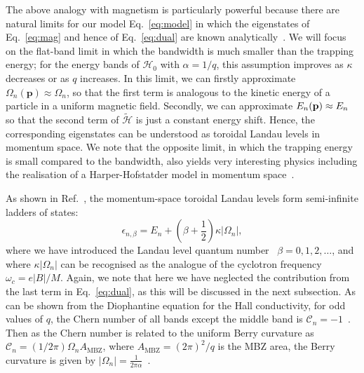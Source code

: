 The above analogy with magnetism is particularly powerful because
there are natural limits for our model Eq.~\eqref{eq:model} in which the
eigenstates of Eq.~\eqref{eq:mag} and hence of Eq.~\eqref{eq:dual} are
known analytically~\cite{price2014magnetic, ozawa2014momhh,
Claassen_prl_2015}. We will focus on the flat-band limit in which the
bandwidth is much smaller than the trapping energy; for the energy
bands of $\mathcal{H}_0$ with $\alpha = 1/q$, this assumption improves
as $\kappa$ decreases or as $q$ increases. In this limit, we can
firstly approximate $\Omega_{n}(\mathbf{p}) \approx \Omega_n$, so that
the first term is analogous to the kinetic energy of a particle in a
uniform magnetic field. Secondly, we can approximate $E_n(\mathbf{p})
\approx E_n$ so that the second term of $\widetilde{\mathcal{H}}$ is
just a constant energy shift. Hence, the corresponding eigenstates can
be understood as toroidal Landau levels in momentum space. We note
that the opposite limit, in which the trapping energy is small
compared to the bandwidth, also yields very interesting physics
including the realisation of a Harper-Hofstatder model in momentum
space~\cite{ozawa2014momhh, scaffidi2014exact}.

As shown in Ref.~\cite{price2014magnetic}, the momentum-space toroidal
Landau levels form semi-infinite ladders of states:
%
\begin{equation}\label{eq:ladders} \epsilon_{n,\beta} = E_n +
\left(\beta + \frac{1}{2}\right) \kappa |\Omega_n| ,
\end{equation} where we have introduced the Landau level quantum
number~\cite{Landau:101810} $\beta = 0,1,2,\dots$, and where $\kappa
|\Omega_n|$ can be
recognised as the analogue of the cyclotron frequency $\omega_c = e
|B| /M $. Again, we note that here we have neglected the contribution
from the last term in Eq.~\eqref{eq:dual}, as this will be discussed in
the next subsection. As can be shown from the Diophantine equation for
the Hall conductivity, for odd values of $q$, the Chern number of all
bands except the middle band is $\mathcal{C}_n =
-1$~\cite{bernevig2013topological}. Then as the Chern number is
related to the uniform Berry curvature as $\mathcal{C}_n = (1/2\pi)
\Omega_n A_{\text{MBZ}}$, where $A_{\text{MBZ}} = (2\pi)^2/q$ is the
MBZ area, the Berry curvature is given by $|\Omega_n| =
\frac{1}{2\pi\alpha}$~\cite{price2014magnetic}.

